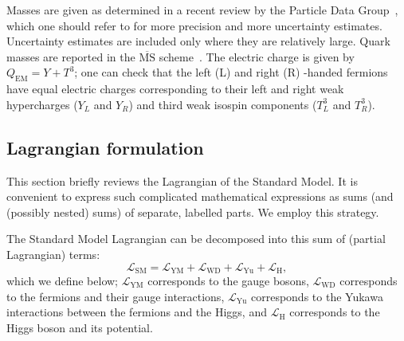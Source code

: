 \begin{table}[tp]
{Masses are given as determined in a recent review by the
Particle Data Group~\cite{pdg2022ynf}, which one should refer to for more
precision and more uncertainty estimates.
Uncertainty estimates are included only where they are relatively large.
Quark masses are reported in the $\overline{\mathrm{MS}}$ scheme~\cite{
pdg2022ynf,
PhysRevD.18.3998
}.
The electric charge is given by $Q_{\mathrm{EM}} = Y + T^3$; one can check
that the left (L) and right (R) -handed fermions have equal electric charges
corresponding to their left and right weak hypercharges ($Y_L$ and $Y_R$)
and third weak isospin components ($T^3_L$ and $T^3_R$).
}
\label{tab:theory_particles_sm_properties}
\end{table}

\subsection{Lagrangian formulation}
\label{sec:theory_sm_lagrangian}
This section briefly reviews the Lagrangian of the Standard Model.
It is convenient to express such complicated mathematical expressions as sums
(and (possibly nested) sums)
of separate, labelled parts.
We employ this strategy.

The Standard Model Lagrangian can be decomposed into this sum of
(partial Lagrangian) terms:
\begin{equation}
\label{eqn:theory_sm_lagrangian_top_sum}
\mathcal{L}_\mathrm{SM} =
\mathcal{L}_\mathrm{YM}
+ \mathcal{L}_\mathrm{WD}
+ \mathcal{L}_\mathrm{Yu}
+ \mathcal{L}_\mathrm{H}
,
\end{equation}
which we define below;
$\mathcal{L}_\mathrm{YM}$ corresponds to the gauge bosons,
$\mathcal{L}_\mathrm{WD}$ corresponds to the fermions and their gauge
interactions,
$\mathcal{L}_\mathrm{Yu}$ corresponds to the Yukawa interactions between the
fermions and the Higgs,
and
$\mathcal{L}_\mathrm{H}$ corresponds to the Higgs boson and its potential.

